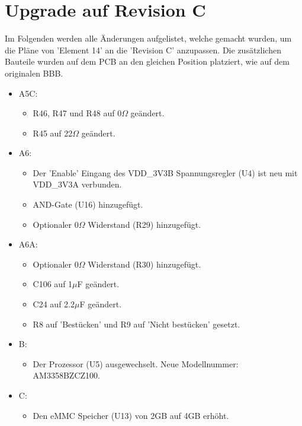 \section{Upgrade auf Revision C}\label{sec:upgrade_rev_c}
Im Folgenden werden alle Änderungen aufgelistet, welche gemacht wurden, um die Pläne von 'Element 14' an die 'Revision C' anzupassen. Die zusätzlichen Bauteile wurden auf dem PCB an den gleichen Position platziert, wie auf dem originalen BBB.

\begin{itemize}
\item A5C: 
	\begin{itemize}
	\item R46, R47 und R48 auf 0$\Omega$ geändert.
	\item R45 auf 22$\Omega$ geändert.	
	\end{itemize}
\item A6:
	\begin{itemize}
	\item Der 'Enable' Eingang des VDD\_3V3B Spannungsregler (U4) ist neu mit VDD\_3V3A verbunden.
	\item AND-Gate (U16) hinzugefügt.	
	\item Optionaler 0$\Omega$ Widerstand (R29) hinzugefügt.	
	\end{itemize}
\item A6A:
	\begin{itemize}
	\item Optionaler 0$\Omega$ Widerstand (R30) hinzugefügt.
	\item C106 auf 1$\mu$F geändert.
	\item C24 auf 2.2$\mu$F geändert.
	\item R8 auf 'Bestücken' und R9 auf 'Nicht bestücken' gesetzt.
	\end{itemize}
\item B:
	\begin{itemize}
	\item Der Prozessor (U5) ausgewechselt. Neue Modellnummer: AM3358BZCZ100.	
	\end{itemize}
\item C:
	\begin{itemize}
	\item Den eMMC Speicher (U13) von 2GB auf 4GB erhöht.
	\end{itemize}
\end{itemize}



